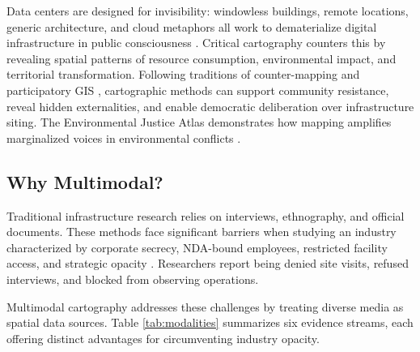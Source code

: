 \documentclass[review]{elsarticle}
\begin{document}
Data centers are designed for invisibility: windowless buildings, remote locations, generic architecture, and cloud metaphors all work to dematerialize digital infrastructure in public consciousness \citep{Hogan2015}. Critical cartography counters this by revealing spatial patterns of resource consumption, environmental impact, and territorial transformation. Following traditions of counter-mapping and participatory GIS \citep{Peluso1995, Crampton2005}, cartographic methods can support community resistance, reveal hidden externalities, and enable democratic deliberation over infrastructure siting. The Environmental Justice Atlas demonstrates how mapping amplifies marginalized voices in environmental conflicts \citep{Temper2015}.

\subsection{Why Multimodal?}

Traditional infrastructure research relies on interviews, ethnography, and official documents. These methods face significant barriers when studying an industry characterized by corporate secrecy, NDA-bound employees, restricted facility access, and strategic opacity \citep{Bast2022}. Researchers report being denied site visits, refused interviews, and blocked from observing operations.

Multimodal cartography addresses these challenges by treating diverse media as spatial data sources. Table \ref{tab:modalities} summarizes six evidence streams, each offering distinct advantages for circumventing industry opacity.
\end{document}

